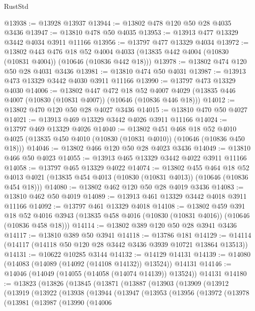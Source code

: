 \begin{lexlean}{RustStd}
\begin{coremodule}
@13938 := @13928 @13937
@13944 := @13802 @478 @120 @50 @28 @4035 @3436
@13947 := @13810 @478 @50 @4035
@13953 := @13913 @477 @13329 @3442 @4034 @3911 @11166
@13956 := @13797 @477 @13329 @4034
@13972 := @13802
    @443
    @476
    @18
    @52
    @4004
    @4033
    (@13835 @442 @4004 (@10830 (@10831 @4004)) (@10646 (@10836 @442 @18)))
@13978 := @13802 @474 @120 @50 @28 @4031 @3436
@13981 := @13810 @474 @50 @4031
@13987 := @13913 @473 @13329 @3442 @4030 @3911 @11166
@13990 := @13797 @473 @13329 @4030
@14006 := @13802
    @447
    @472
    @18
    @52
    @4007
    @4029
    (@13835 @446 @4007 (@10830 (@10831 @4007)) (@10646 (@10836 @446 @18)))
@14012 := @13802 @470 @120 @50 @28 @4027 @3436
@14015 := @13810 @470 @50 @4027
@14021 := @13913 @469 @13329 @3442 @4026 @3911 @11166
@14024 := @13797 @469 @13329 @4026
@14040 := @13802
    @451
    @468
    @18
    @52
    @4010
    @4025
    (@13835 @450 @4010 (@10830 (@10831 @4010)) (@10646 (@10836 @450 @18)))
@14046 := @13802 @466 @120 @50 @28 @4023 @3436
@14049 := @13810 @466 @50 @4023
@14055 := @13913 @465 @13329 @3442 @4022 @3911 @11166
@14058 := @13797 @465 @13329 @4022
@14074 := @13802
    @455
    @464
    @18
    @52
    @4013
    @4021
    (@13835 @454 @4013 (@10830 (@10831 @4013)) (@10646 (@10836 @454 @18)))
@14080 := @13802 @462 @120 @50 @28 @4019 @3436
@14083 := @13810 @462 @50 @4019
@14089 := @13913 @461 @13329 @3442 @4018 @3911 @11166
@14092 := @13797 @461 @13329 @4018
@14108 := @13802
    @459
    @391
    @18
    @52
    @4016
    @3943
    (@13835 @458 @4016 (@10830 (@10831 @4016)) (@10646 (@10836 @458 @18)))
@14114 := @13802 @389 @120 @50 @28 @3941 @3436
@14117 := @13810 @389 @50 @3941
@14118 := @13786 @181
@14129 := @14114 (@14117 (@14118 @50 @120 @28 @3442 @3436 @3939 @10721 @13864 @13513))
@14131 := @10622 @10285 @3144
@14132 := @14129 @14131
@14139 := @14080 (@14083 (@14089 (@14092 (@14108 @14132)) @13524)) @14131
@14146 := @14046 (@14049 (@14055 (@14058 (@14074 @14139)) @13524)) @14131
@14180 := @13823
    (@13826
      (@13845
        (@13871
          (@13887
            (@13903
              (@13909
                (@13912
                  (@13919
                    (@13922
                      (@13938
                        (@13944
                          (@13947
                            (@13953
                              (@13956
                                (@13972
                                  (@13978
                                    (@13981
                                      (@13987
                                        (@13990
                                          (@14006

\end{coremodule}
\end{lexlean}
